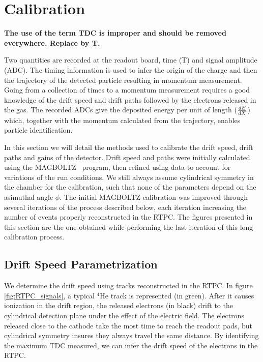 \documentclass[twocolumn,showpacs,superscriptaddress,groupedaddress]{revtex4}
\begin{document}
\section{Calibration} \label{sec_calib}

{\bf \color{red} The use of the term TDC is improper and should be removed
everywhere. Replace by T.}

Two quantities are recorded at the readout board, 
time (T) and signal amplitude (ADC). The timing information is used to infer 
the origin of the charge and then the trajectory of the detected particle
resulting in momentum measurement. Going from a collection of 
times to a momentum measurement requires a good knowledge of the drift speed 
and drift paths followed by the electrons released in the gas. The recorded ADCs give 
the deposited energy per unit of length ($\small{\frac{dE}{dX}}$) which, 
together with the momentum calculated from the trajectory, enables particle 
identification.

In this section we will detail the methods used to calibrate the drift speed,
drift paths and gains of the detector. Drift speed and paths were initially
calculated using the MAGBOLTZ~\cite{MAGBOLTZ} program, then refined using
data to account for variations of the run conditions. We still always assume 
cylindrical symmetry in the chamber for the calibration, such that none of
the parameters depend on the asimuthal angle $\phi$. The initial MAGBOLTZ
calibration was improved through several iterations of the
process described below, each iteration increasing the number of events 
properly reconstructed in the RTPC. The figures presented in this section
are the one obtained while performing the last iteration of this long 
calibration process.


\subsection{Drift Speed Parametrization}

We determine the drift speed using tracks reconstructed in the RTPC. In figure 
\ref{fig:RTPC_signals}, a typical $^{4}$He track is represented (in green). After 
it causes ionization in the drift region, the released electrons (in black) 
drift to the cylindrical detection plane under the effect of the electric field. The 
electrons released close to the cathode take the most time to reach the readout 
pads, but cylindrical symmetry insures they always travel the same 
distance. By identifying the maximum TDC measured, we can infer the drift 
speed of the electrons in the RTPC.\\
\end{document}
